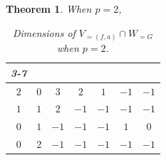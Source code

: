 \documentclass{amsart}
\numberwithin{equation}{section}
\newtheorem{theorem}{Theorem}[section]  %
\theoremstyle{definition}
\theoremstyle{remark}
\begin{document}
\begin{theorem}
When $p=2$,
\begin{table}[H]
\centering
\begin{tabular}{cc|c|c|c|c|c|}
\cline{3-7}
                                                & &\cellcolor[HTML]{a7c957}{\color[HTML]{333333} $C_2$} & \cellcolor[HTML]{a7c957}{\color[HTML]{333333} $C_2^2$} & \cellcolor[HTML]{a7c957}{\color[HTML]{333333} $D_6$} & \cellcolor[HTML]{a7c957}{\color[HTML]{333333} $C_2^5$} & \cellcolor[HTML]{a7c957}{\color[HTML]{333333} $C_2\wr C_5$} \\ \hline
\multicolumn{1}{|c|}{\cellcolor[HTML]{a7c957}$2$} & \cellcolor[HTML]{a7c957}$0$ &{\color[HTML]{333333} $3$}                             & {\color[HTML]{333333} $2$}                                       & {\color[HTML]{333333} $1$}                             & {\color[HTML]{C0C0C0}  $-1$}                              & {\color[HTML]{C0C0C0}  $-1$}                                   \\ \hline
\multicolumn{1}{|c|}{\cellcolor[HTML]{a7c957}$1$} & \cellcolor[HTML]{a7c957}$1$ &{\color[HTML]{333333} $2$}                             & {\color[HTML]{C0C0C0}  $-1$}                                      & {\color[HTML]{C0C0C0}  $-1$}                            & {\color[HTML]{C0C0C0}  $-1$}                              & {\color[HTML]{C0C0C0}  $-1$}                                   \\ \hline
\multicolumn{1}{|c|}{\cellcolor[HTML]{a7c957}$0$} & \cellcolor[HTML]{a7c957}$1$ &{\color[HTML]{C0C0C0}  $-1$}                            & {\color[HTML]{C0C0C0}  $-1$}                                      & {\color[HTML]{C0C0C0}  $-1$}                            & {\color[HTML]{333333} $1$}                               & {\color[HTML]{333333} $0$}                                    \\ \hline
\multicolumn{1}{|c|}{\cellcolor[HTML]{a7c957}$0$} & \cellcolor[HTML]{a7c957}$2$ &{\color[HTML]{C0C0C0}  $-1$}                            & {\color[HTML]{C0C0C0}  $-1$}                                      & {\color[HTML]{C0C0C0}  $-1$}                            & {\color[HTML]{C0C0C0}  $-1$}                                & {\color[HTML]{C0C0C0}  $-1$}                                    \\ \hline
\end{tabular}
\caption{Dimensions of $V_{=(f,a)}\cap W_{= G}$ when $p=2$.}
\end{table}


\end{theorem}
\end{document}
